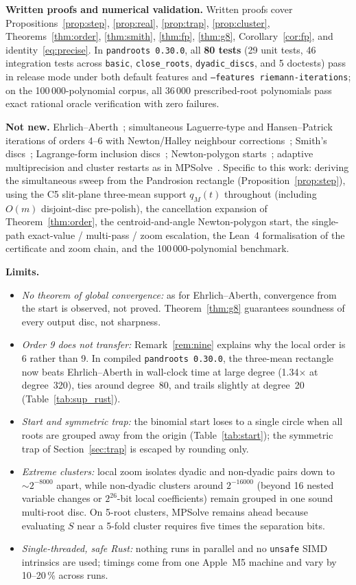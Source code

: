 \documentclass[10pt,a4paper]{article}
\theoremstyle{definition}
\numberwithin{equation}{section}
\begin{document}
\textbf{Written proofs and numerical validation.}
Written proofs cover Propositions~\ref{prop:step}, \ref{prop:real}, \ref{prop:trap}, \ref{prop:cluster}, Theorems~\ref{thm:order}, \ref{thm:smith}, \ref{thm:fp}, \ref{thm:g8}, Corollary~\ref{cor:fp}, and identity~\eqref{eq:precise}. In \texttt{pandroots 0.30.0}, all \textbf{80 tests} (29 unit tests, 46 integration tests across \texttt{basic}, \texttt{close\_roots}, \texttt{dyadic\_discs}, and 5 doctests) pass in release mode under both default features and \texttt{--features riemann-iterations}; on the 100\,000-polynomial corpus, all 36\,000 prescribed-root polynomials pass exact rational oracle verification with zero failures.

\textbf{Not new.}
Ehrlich--Aberth~\cite{ehrlich,aberth}; simultaneous Laguerre-type and Hansen--Patrick iterations of orders 4--6 with Newton/Halley neighbour corrections~\cite{hp,hpr,nourein,ppz,prp}; Smith's discs~\cite{smith}; Lagrange-form inclusion discs~\cite{bs,bh}; Newton-polygon starts~\cite{bini}; adaptive multiprecision and cluster restarts as in MPSolve~\cite{mpsolve}. Specific to this work: deriving the simultaneous sweep from the Pandrosion rectangle (Proposition~\ref{prop:step}), using the C5 slit-plane three-mean support $q_M(t)$ throughout (including $O(m)$ disjoint-disc pre-polish), the cancellation expansion of Theorem~\ref{thm:order}, the centroid-and-angle Newton-polygon start, the single-path exact-value / multi-pass / zoom escalation, the Lean~4 formalisation of the certificate and zoom chain, and the 100\,000-polynomial benchmark.

\textbf{Limits.}
\begin{itemize}
\item \emph{No theorem of global convergence:} as for Ehrlich--Aberth, convergence from the start is observed, not proved. Theorem~\ref{thm:g8} guarantees soundness of every output disc, not sharpness.
\item \emph{Order 9 does not transfer:} Remark~\ref{rem:nine} explains why the local order is 6 rather than 9. In compiled \texttt{pandroots 0.30.0}, the three-mean rectangle now beats Ehrlich--Aberth in wall-clock time at large degree (1.34$\times$ at degree~320), ties around degree~80, and trails slightly at degree~20 (Table~\ref{tab:sup_rust}).
\item \emph{Start and symmetric trap:} the binomial start loses to a single circle when all roots are grouped away from the origin (Table~\ref{tab:start}); the symmetric trap of Section~\ref{sec:trap} is escaped by rounding only.
\item \emph{Extreme clusters:} local zoom isolates dyadic and non-dyadic pairs down to $\sim 2^{-8000}$ apart, while non-dyadic clusters around $2^{-16000}$ (beyond 16 nested variable changes or $2^{26}$-bit local coefficients) remain grouped in one sound multi-root disc. On 5-root clusters, MPSolve remains ahead because evaluating $S$ near a 5-fold cluster requires five times the separation bits.
\item \emph{Single-threaded, safe Rust:} nothing runs in parallel and no \texttt{unsafe} SIMD intrinsics are used; timings come from one Apple~M5 machine and vary by 10--20\,\% across runs.
\end{itemize}
\end{document}
